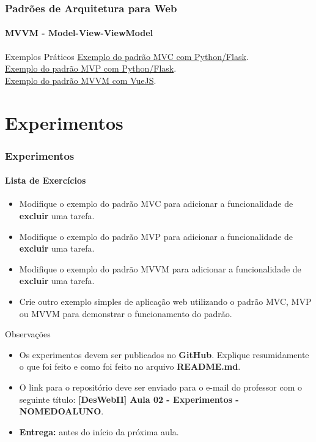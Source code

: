 \documentclass[
	10pt, %
	t, %
]{beamer}
\newcommand{\iconLink}[2]{\href{#1}{\faLink \hspace{0.2em} {#2}}}
\begin{document}
\begin{frame}
	\frametitle{Padrões de Arquitetura para Web}
	\framesubtitle{MVVM - Model-View-ViewModel}

	\begin{block}{Exemplos Práticos}
		\iconLink{https://gist.github.com/fabricioifc/d1bde9f4a13cf63b49870be4bc87a72f}{Exemplo do padrão MVC com Python/Flask}.\\
		\iconLink{https://gist.github.com/fabricioifc/663f8abcba307a013bb56d214752458b}{Exemplo do padrão MVP com Python/Flask}.\\
		\iconLink{https://codepen.io/fabriciobizotto/pen/MWxeONo}{Exemplo do padrão MVVM com VueJS}.
	\end{block}
\end{frame}


\section{Experimentos}

\begin{frame}
	\frametitle{Experimentos}
	\framesubtitle{Lista de Exercícios}
	
	\begin{itemize}
		\item Modifique o exemplo do padrão MVC para adicionar a funcionalidade de \textbf{excluir} uma tarefa.
		\item Modifique o exemplo do padrão MVP para adicionar a funcionalidade de \textbf{excluir} uma tarefa.
		\item Modifique o exemplo do padrão MVVM para adicionar a funcionalidade de \textbf{excluir} uma tarefa.
		\item Crie outro exemplo simples de aplicação web utilizando o padrão MVC, MVP ou MVVM para demonstrar o funcionamento do padrão.
	\end{itemize}

	\begin{block}{Observações}
		\begin{itemize}
			\item Os experimentos devem ser publicados no \textbf{GitHub}. Explique resumidamente o que foi feito e como foi feito no arquivo \textbf{README.md}.
			\item O link para o repositório deve ser enviado para o e-mail do professor com o seguinte título: \textbf{[DesWebII] Aula 02 - Experimentos - NOMEDOALUNO}.
			\item \textbf{Entrega:} antes do início da próxima aula.
		\end{itemize}
	\end{block}
	
\end{frame}
\end{document}
